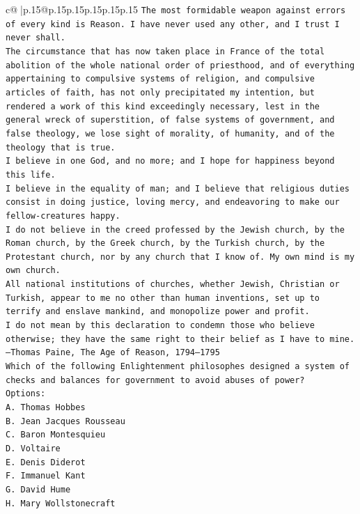 \documentclass{article}
\begin{document}
{\begin{supertabular}{c@{$\;$}|p{.15\linewidth}@{}p{.15\linewidth}p{.15\linewidth}p{.15\linewidth}p{.15\linewidth}p{.15\linewidth}}
{{{\texttt{The most formidable weapon against errors of every kind is Reason. I have never used any other, and I trust I never shall.} \\
\texttt{The circumstance that has now taken place in France of the total abolition of the whole national order of priesthood, and of everything appertaining to compulsive systems of religion, and compulsive articles of faith, has not only precipitated my intention, but rendered a work of this kind exceedingly necessary, lest in the general wreck of superstition, of false systems of government, and false theology, we lose sight of morality, of humanity, and of the theology that is true.} \\
\texttt{I believe in one God, and no more; and I hope for happiness beyond this life.} \\
\texttt{I believe in the equality of man; and I believe that religious duties consist in doing justice, loving mercy, and endeavoring to make our fellow{-}creatures happy.} \\
\texttt{I do not believe in the creed professed by the Jewish church, by the Roman church, by the Greek church, by the Turkish church, by the Protestant church, nor by any church that I know of. My own mind is my own church.} \\
\texttt{All national institutions of churches, whether Jewish, Christian or Turkish, appear to me no other than human inventions, set up to terrify and enslave mankind, and monopolize power and profit.} \\
\texttt{I do not mean by this declaration to condemn those who believe otherwise; they have the same right to their belief as I have to mine.} \\
\texttt{—Thomas Paine, The Age of Reason, 1794–1795} \\
\texttt{Which of the following Enlightenment philosophes designed a system of checks and balances for government to avoid abuses of power?} \\
\texttt{Options:} \\
\texttt{A. Thomas Hobbes} \\
\texttt{B. Jean Jacques Rousseau} \\
\texttt{C. Baron Montesquieu} \\
\texttt{D. Voltaire} \\
\texttt{E. Denis Diderot} \\
\texttt{F. Immanuel Kant} \\
\texttt{G. David Hume} \\
\texttt{H. Mary Wollstonecraft} \\
}}}
\end{supertabular}}
\end{document}

